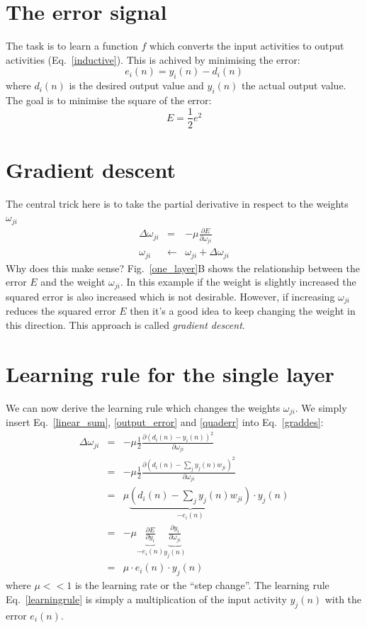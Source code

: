\documentclass[12pt]{article}
\begin{document}
\section{The error signal}
The task is to learn a function $f$ which converts the input activities to output activities
(Eq.~\ref{inductive}).
This is achived by minimising the error:
\begin{equation}
  e_i(n) = y_i(n) - d_i(n) \label{output_error}
\end{equation}
where $d_i(n)$ is the desired output value and $y_i(n)$ the actual output value.
The goal is to minimise the square of the error:
\begin{equation}
  E = \frac{1}{2} e^2 \label{quaderr}
\end{equation}

\section{Gradient descent}
The central trick here is to take the partial derivative in respect to the weights $\omega_{ji}$
\begin{eqnarray}
  \Delta\omega_{ji} & = & - \mu \frac{\partial E}{\partial \omega_{ji}} \label{graddes} \\
  \omega_{ji} & \leftarrow & \omega_{ji} + \Delta\omega_{ji}
\end{eqnarray}
Why does this make sense? Fig.~\ref{one_layer}B shows the relationship
between the error $E$ and the weight $\omega_{ji}$. In this example if
the weight is slightly increased the squared error is also increased
which is not desirable.  However, if increasing $\omega_{ji}$ reduces
the squared error $E$ then it's a good idea to keep changing the
weight in this direction. This approach is called \textsl{gradient
  descent}.

\section{Learning rule for the single layer}
We can now derive the learning rule which changes the weights
$\omega_{ji}$.  We simply insert Eq.~\ref{linear_sum},
\ref{output_error} and \ref{quaderr} into Eq.~\ref{graddes}:
\begin{eqnarray}
  \Delta\omega_{ji}
   & = & - \mu \frac{1}{2} \frac{\partial ( d_i(n) - y_i(n) )^2 }{\partial \omega_{ji}} \\
   & = & - \mu \frac{1}{2} \frac{\partial \left( d_i(n) - \sum_j y_j(n) w_{ji} \right)^2 }{\partial \omega_{ji}} \\
  & = & \mu \underbrace{\left(d_i(n) - \sum_j y_j(n) w_{ji}\right)}_{-e_i(n)} \cdot y_j(n) \\
   & = & - \mu \underbrace{\frac{\partial E}{\partial y_i}}_{-e_i(n)} \underbrace{\frac{\partial y_i}{\partial \omega_{ji}}}_{y_j(n)} \label{chainrule}\\
  & = & \mu \cdot e_i(n) \cdot y_j(n) \label{learningrule}
\end{eqnarray}
where $\mu << 1$ is the learning rate or the ``step change''. The
learning rule Eq.~\ref{learningrule} is simply a multiplication of the
input activity $y_j(n)$ with the error $e_i(n)$.
\end{document}

